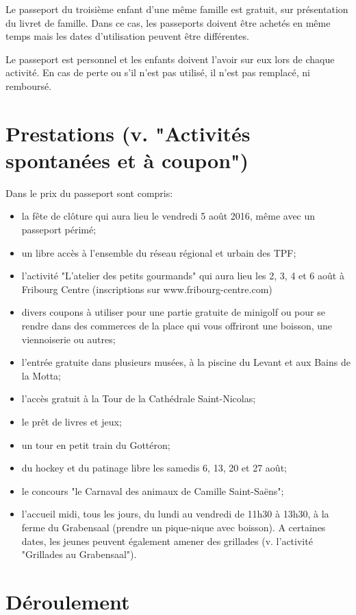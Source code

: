 Le passeport du troisième enfant d'une même famille est gratuit, sur présentation du livret de famille. Dans ce cas, les passeports doivent être achetés en même temps mais les dates d'utilisation peuvent être différentes. 

Le passeport est personnel et les enfants doivent l'avoir sur eux lors de chaque activité. En cas de perte ou s'il n'est pas utilisé, il n'est pas remplacé, ni remboursé. 

\section*{Prestations (v. "Activités spontanées et à coupon")}

Dans le prix du passeport sont compris:

\begin{itemize}
\item la fête de clôture qui aura lieu le vendredi 5 août 2016, même avec un passeport périmé;
\item un libre accès à l'ensemble du réseau régional et urbain des TPF;
\item l'activité "L'atelier des petits gourmands" qui aura lieu les 2, 3, 4 et 6 août à Fribourg Centre (inscriptions sur www.fribourg-centre.com)
\item divers coupons à utiliser pour une partie gratuite de minigolf ou pour se rendre dans des commerces de la place qui vous offriront une boisson, une viennoiserie ou autres;
\item l'entrée gratuite dans plusieurs musées, à la piscine du Levant et aux Bains de la Motta;
\item l'accès gratuit à la Tour de la Cathédrale Saint-Nicolas; 
\item le prêt de livres et jeux;
\item un tour en petit train du Gottéron;
\item du hockey et du patinage libre les samedis 6, 13, 20 et 27 août;
\item le concours "le Carnaval des animaux de Camille Saint-Saëns";
\item l'accueil midi, tous les jours, du lundi au vendredi de 11h30 à 13h30, à la ferme du Grabensaal (prendre un pique-nique avec boisson). A certaines dates, les jeunes peuvent également amener des grillades (v. l'activité "Grillades au Grabensaal").
\end{itemize}

\section*{Déroulement}

